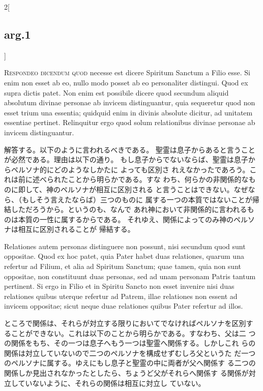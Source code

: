 \documentclass[paper=a4paper,fontsize=10pt,jafontsize=9pt,titlepage]{jlreq}
\begin{document}
\begin{paracol}{2}[\subsection{arg.1}]

{\scshape Respondeo dicendum quod} necesse est dicere Spiritum Sanctum a Filio
esse. Si enim non esset ab eo, nullo modo posset ab eo personaliter
distingui. Quod ex supra dictis patet. Non enim est possibile dicere
quod secundum aliquid absolutum divinae personae ab invicem
distinguantur, quia sequeretur quod non esset trium una essentia;
quidquid enim in divinis absolute dicitur, ad unitatem essentiae
pertinet. Relinquitur ergo quod solum relationibus divinae personae ab
invicem distinguantur.

\switchcolumn

解答する。以下のように言われるべきである。
聖霊は息子からあると言うことが必然である。理由は以下の通り。
もし息子からでないならば、聖霊は息子からペルソナ的にどのようなしかたに
 よっても区別さ
 れえなかったであろう。これは前に述べられたことから明らかである。すな
 わち、何らかの非関係的なものに即して、神のペルソナが相互に区別される
 と言うことはできない。なぜなら、（もしそう言えたならば）三つのものに
 属する一つの本質ではないことが帰結しただろうから。というのも、なんで
 あれ神において非関係的に言われるものは本質の一性に属するからである。
 それゆえ、関係によってのみ神のペルソナは相互に区別されることが
帰結する。

\switchcolumn*

Relationes autem personas distinguere non
possunt, nisi secundum quod sunt oppositae. Quod ex hoc patet, quia
Pater habet duas relationes, quarum una refertur ad Filium, et alia ad
Spiritum Sanctum; quae tamen, quia non sunt oppositae, non constituunt
duas personas, sed ad unam personam Patris tantum pertinent. Si ergo
in Filio et in Spiritu Sancto non esset invenire nisi duas relationes
quibus uterque refertur ad Patrem, illae relationes non essent ad
invicem oppositae; sicut neque duae relationes quibus Pater refertur
ad illos.

\switchcolumn

ところで関係は、それらが対立する限りにおいてでなければペルソナを区別す
 ることができない。これは以下のことから明らかである。すなわち、父は二
 つの関係をもち、その一つは息子へもう一つは聖霊へ関係する。しかしこれ
 らの関係は対立していないので二つのペルソナを構成せずむしろ父というた
 だ一つのペルソナに属する。ゆえにもし息子と聖霊の中に両者が父へ関係す
 る二つの関係しか見出されなかったとしたら、ちょうど父がそれらへ関係す
 る関係が対立していないように、それらの関係は相互に対立し
 ていない。


\end{paracol}
\end{document}
